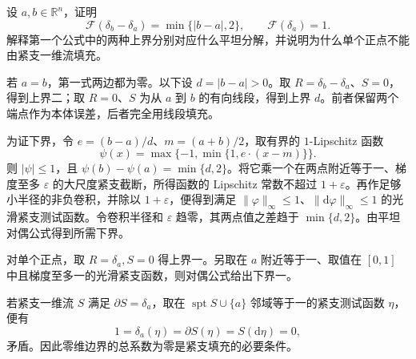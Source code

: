 \begin{exercise}\label{g3:ex:flat-distance-two-points}
	设 \(a,b\in\mathbb R^n\)，证明
	\[
		\mathcal F(\delta_b-\delta_a)=\min\{|b-a|,2\},\qquad
		\mathcal F(\delta_a)=1.
	\]
	解释第一个公式中的两种上界分别对应什么平坦分解，并说明为什么单个正点不能由紧支一维流填充。
\end{exercise}
\begin{solution}
	若 \(a=b\)，第一式两边都为零。以下设 \(d=|b-a|>0\)。取 \(R=\delta_b-\delta_a\)、\(S=0\)，得到上界二；取 \(R=0\)、\(S\) 为从 \(a\) 到 \(b\) 的有向线段，得到上界 \(d\)。前者保留两个端点作为本体误差，后者完全用线段填充。

	为证下界，令 \(e=(b-a)/d\)、\(m=(a+b)/2\)，取有界的 \(1\)-Lipschitz 函数
	\[
		\psi(x)=\max\{-1,\min\{1,e\cdot(x-m)\}\}.
	\]
	则 \(|\psi|\le1\)，且 \(\psi(b)-\psi(a)=\min\{d,2\}\)。将它乘一个在两点附近等于一、梯度至多 \(\varepsilon\) 的大尺度紧支截断，所得函数的 Lipschitz 常数不超过 \(1+\varepsilon\)。再作足够小半径的非负卷积，并除以 \(1+\varepsilon\)，便得到满足 \(\|\varphi\|_\infty\le1\)、\(\|\mathrm d\varphi\|_\infty\le1\) 的光滑紧支测试函数。令卷积半径和 \(\varepsilon\) 趋零，其两点值之差趋于 \(\min\{d,2\}\)。由平坦对偶公式得到所需下界。

	对单个正点，取 \(R=\delta_a,S=0\) 得上界一。另取在 \(a\) 附近等于一、取值在 \([0,1]\) 中且梯度至多一的光滑紧支函数，则对偶公式给出下界一。

	若紧支一维流 \(S\) 满足 \(\partial S=\delta_a\)，取在 \(\operatorname{spt}S\cup\{a\}\) 邻域等于一的紧支测试函数 \(\eta\)，便有
	\[
		1=\delta_a(\eta)=\partial S(\eta)=S(\mathrm d\eta)=0,
	\]
	矛盾。因此零维边界的总系数为零是紧支填充的必要条件。
\end{solution}

